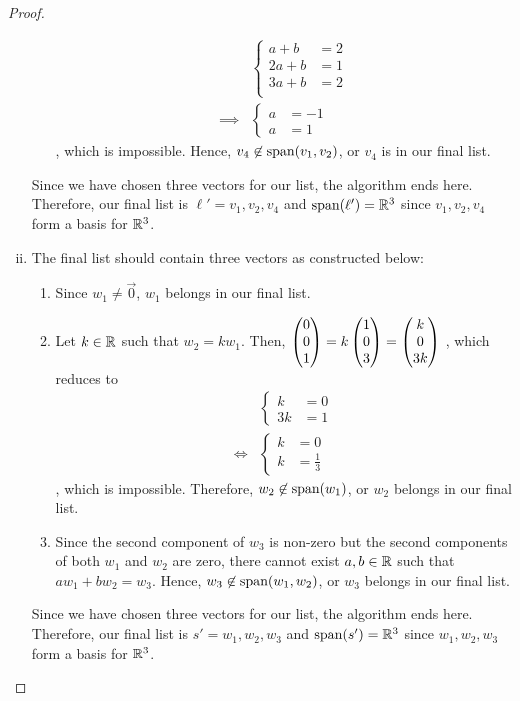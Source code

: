 \begin{proof}
\begin{enumerate}[(i)]
\begin{enumerate}[Step 1:]
            \begin{align*}
                &\begin{cases}
                    a+b  &= 2\\
                    2a+b &= 1\\
                    3a+b &= 2\\
                \end{cases}\\\implies
                &\begin{cases}
                    a    &= -1\\
                    a    &= 1
                \end{cases}
            \end{align*}
            , which is impossible. Hence, $v_4\not\in\textnormal{span}(v_1,v_2)$, or $v_4$ is in our final list.
        \end{enumerate}
        Since we have chosen three vectors for our list, the algorithm ends here. Therefore, our final list is $\ell'=v_1,v_2,v_4$ and $\textnormal{span}(\ell')=\mathbb R^3$ since $v_1,v_2,v_4$ form a basis for $\mathbb R^3$.
        \item The final list should contain three vectors as constructed below:
        \begin{enumerate}[Step 1:]
            \item Since $w_1\not=\vec{0}$, $w_1$ belongs in our final list.
            \item Let $k\in\mathbb R$ such that $w_2=kw_1$. Then, $\begin{pmatrix} 0\\ 0\\ 1\end{pmatrix}=k\begin{pmatrix} 1\\ 0\\ 3\end{pmatrix}=\begin{pmatrix} k\\ 0\\ 3k\end{pmatrix}$
            , which reduces to
            \begin{align*}
                &\begin{cases}
                    k &= 0\\
                    3k&= 1
                \end{cases}\\\iff
                &\begin{cases}
                    k &= 0\\
                    k &= \frac{1}{3}
                \end{cases}
            \end{align*}
            , which is impossible. Therefore, $w_2\not\in\textnormal{span}(w_1)$, or $w_2$ belongs in our final list.
            \item Since the second component of $w_3$ is non-zero but the second components of both $w_1$ and $w_2$ are zero, there cannot exist $a,b\in\mathbb R$ such that $aw_1+bw_2=w_3$. Hence, $w_3\not\in\textnormal{span}(w_1,w_2)$, or $w_3$ belongs in our final list.
        \end{enumerate}
        Since we have chosen three vectors for our list, the algorithm ends here. Therefore, our final list is $s'=w_1,w_2,w_3$ and $\textnormal{span}(s')=\mathbb R^3$ since $w_1,w_2,w_3$ form a basis for $\mathbb R^3$.
        
    \end{enumerate}
    \renewcommand{\qedsymbol}{}
\end{proof}